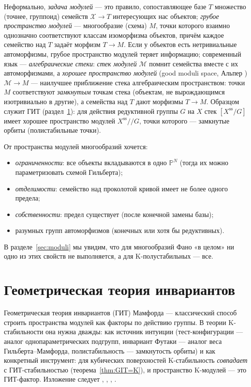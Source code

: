 \documentclass[11pt,a4paper]{article}
\theoremstyle{plain}
\theoremstyle{definition}
\theoremstyle{remark}
\newcommand{\PP}{\mathbb{P}}
\newcommand{\cX}{\mathcal{X}}
\newcommand{\cM}{\mathcal{M}}
\newcommand{\ssl}{\mathrm{ss}}
\begin{document}
Неформально, \emph{задача модулей} --- это правило, сопоставляющее базе $T$ множество (точнее,
группоид) семейств $\cX\to T$ интересующих нас объектов; \emph{грубое пространство модулей} ---
многообразие (схема) $M$, точки которого взаимно однозначно соответствуют классам изоморфизма объектов,
причём каждое семейство над $T$ задаёт морфизм $T\to M$. Если у объектов есть нетривиальные
автоморфизмы, грубое пространство модулей теряет информацию; современный язык --- \emph{алгебраические
стеки}: \emph{стек модулей} $\cM$ помнит семейства вместе с их автоморфизмами, а \emph{хорошее
пространство модулей} (good moduli space, Альпер \cite{Alper}) $\cM\to M$ --- наилучшее приближение
стека алгебраическим пространством: точки $M$ соответствуют \emph{замкнутым} точкам стека
(объектам, не вырождающимся изотривиально в другие), а семейства над $T$ дают морфизмы $T\to M$.
Образцом служит ГИТ (раздел~\ref{sec:git}): для действия редуктивной группы $G$ на $X$ стек
$[X^{\ssl}/G]$ имеет хорошее пространство модулей $X^{\ssl}/\!/G$, точки которого --- замкнутые
орбиты (полистабильные точки).

От пространства модулей многообразий хочется:
\begin{itemize}
\item \emph{ограниченности}: все объекты вкладываются в одно $\PP^N$ (тогда их можно
параметризовать схемой Гильберта);
\item \emph{отделимости}: семейство над проколотой кривой имеет не более одного предела;
\item \emph{собственности}: предел существует (после конечной замены базы);
\item разумных групп автоморфизмов (конечных или хотя бы редуктивных).
\end{itemize}
В разделе~\ref{sec:moduli} мы увидим, что для многообразий Фано «в целом» ни одно из этих
свойств не выполняется, а для K-полустабильных --- все.

\section{Геометрическая теория инвариантов}\label{sec:git}

Геометрическая теория инвариантов (ГИТ) Мамфорда \cite{MFK} --- классический способ строить
пространства модулей как факторы по действию группы. В теории K-стабильности она нужна дважды:
как источник интуиции (тест-конфигурации --- аналог однопараметрических подгрупп, инвариант
Футаки --- аналог веса Гильберта--Мамфорда, полистабильность --- замкнутость орбиты) и как
конкретный инструмент: для кубических поверхностей K-стабильность \emph{совпадает} с
ГИТ-стабильностью (теорема~\ref{thm:GIT=K}), и пространство K-модулей --- это ГИТ-фактор.
Изложение следует \cite{MFK}, \cite{Dolg-IT}, \cite{Mukai}, \cite{PV}.
\end{document}
